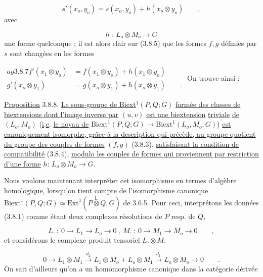 \begin{equation}\tag{3.8.6}
s'(x_o,y_o) = s(x_o,y_o) + h(x_o \otimes y_o) \qquad ,
\end{equation}
avec

\begin{equation*}
h \ : \ L_o \otimes M_o \longrightarrow G
\end{equation*}
une forme quelconque ; il est alors clair sur (3.8.5) que les formes $f,g$ définies par $s$ sont changées en les formes

$\begin{aligned}	ag{3.8.7} f'(x_1 \otimes y_o) &= f(x_1 \otimes y_o) + h(x_1 \otimes y_o) \\ g'(x_o \otimes y_1) &= g(x_o \otimes y_1) + h(x_o \otimes y_1) \qquad . \end{aligned}$
On trouve ainsi :

\underline{Proposition} 3.8.8. \underline{Le sous-groupe de Biext}$^1(P,Q;G)$ \underline{formée des classes de biextensions dont l'image inverse par} $(u,v)$ \underline{est une biextension} \underline{triviale} \underline{de} $(L_o,M_o)$ (\underline{i}.\underline{e}. \underline{le noyau de} $\mathrm{Biext}^1(P,Q;G) \longrightarrow \mathrm{Biext}^1(L_o,M_o;G)$) \underline{est canoniquement isomorphe, grâce à la description qui précède, au groupe quotient}
\underline{du groupe des couples de formes} $(f,g)$ (3.8.3), \underline{satisfaisant la condition de compatibilité} (3.8.4), \underline{modulo les couples de formes qui proviennent par restriction d'une forme} $h$: $L_o \otimes M_o \longrightarrow G$.

Nous voulons maintenant interpréter cet isomorphisme en termes d'algèbre homologique, lorsqu'on tient compte de l'isomorphisme canonique $\mathrm{Biext}^1(P,Q;G) \simeq \mathrm{Ext}^1(P \overset{\mathbb{L}}{\otimes} Q,G)$ de 3.6.5. Pour ceci, interprétons les données (3.8.1) comme étant deux complexes résolutions de $P$ resp. de $Q$,

\begin{equation}\tag{3.8.9}
L. \ : \ 0 \longrightarrow L_1 \longrightarrow L_o \longrightarrow 0 \ , \ M. \ : \ 0 \longrightarrow M_1 \longrightarrow M_o \longrightarrow 0 \qquad ,
\end{equation}
et considérons le complexe produit tensoriel $L. \otimes M.$

\begin{equation*}
0 \longrightarrow L_1 \otimes M_1 \overset{d_2}{\longrightarrow} L_1 \otimes M_o + L_o \otimes M_1 \overset{d_1}{\longrightarrow} L_o \otimes M_o \longrightarrow 0 \qquad .
\end{equation*}
On sait d'ailleurs qu'on a un homomorphisme canonique dans la catégorie dérivée

